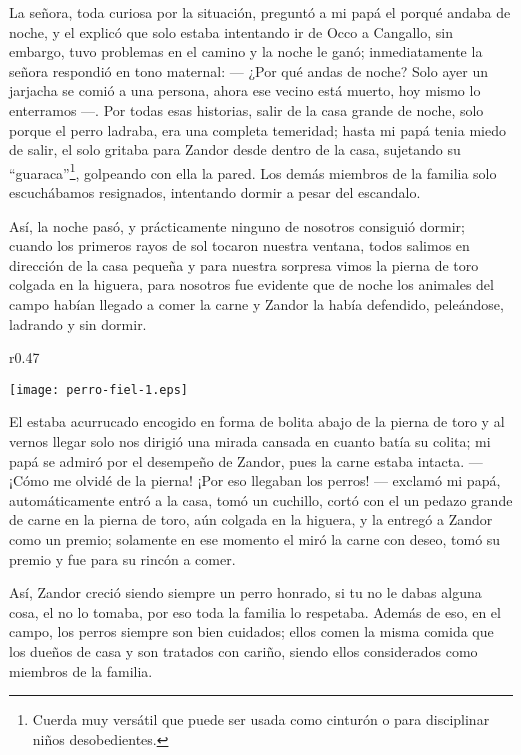 La señora, toda curiosa por la situación, preguntó a mi papá el porqué andaba de noche, y el explicó que solo estaba intentando ir de Occo a Cangallo, sin embargo, tuvo problemas en el camino y la noche le ganó; inmediatamente la señora respondió en tono maternal: 
--- ¿Por qué andas de noche? Solo ayer un jarjacha se comió a una persona, ahora ese vecino está muerto, hoy mismo lo enterramos ---.
Por todas esas historias, salir de la casa grande de noche, solo porque el perro ladraba, era una completa temeridad; hasta mi papá tenia miedo de salir, el solo gritaba para Zandor desde dentro de la casa, sujetando su ``guaraca''\footnote{Cuerda muy versátil que puede ser usada como cinturón o para disciplinar niños desobedientes.}, golpeando con ella la pared.
Los demás miembros de la familia solo escuchábamos resignados, intentando dormir a pesar del escandalo.

Así, la noche pasó, y prácticamente ninguno de nosotros consiguió dormir; cuando los primeros rayos de sol tocaron nuestra ventana, todos salimos en dirección de la casa pequeña y para nuestra sorpresa vimos la pierna de toro colgada en la higuera, para nosotros fue evidente que de noche los animales del campo habían llegado a comer la carne y Zandor la había defendido, peleándose, ladrando y sin dormir. 
\begin{wrapfigure}{r}{0.47\textwidth}
  \begin{center}
  \vspace{-0.5cm}
    \texttt{[image: perro-fiel-1.eps]}
  \end{center}
  \vspace{-0.5cm}
\end{wrapfigure}
El estaba acurrucado encogido en forma de bolita abajo de la pierna de toro y al vernos llegar solo nos dirigió una mirada cansada en cuanto batía su colita; mi papá se admiró por el desempeño de Zandor, pues la carne estaba intacta. 
--- ¡Cómo me olvidé de la pierna! ¡Por eso llegaban los perros! --- exclamó mi papá, 
automáticamente entró a la casa, tomó un cuchillo, cortó con el un pedazo grande de carne en la pierna de toro, aún colgada en la higuera, y la entregó a Zandor como un premio; solamente en ese momento el miró la carne con deseo, tomó su premio y fue para su rincón a comer.

Así, Zandor creció siendo siempre un perro honrado, si tu no le dabas alguna cosa, el no lo tomaba, por eso toda la familia lo respetaba. Además de eso, en el campo, los perros siempre son bien cuidados; ellos comen la misma comida que los dueños de casa y son tratados con cariño, siendo ellos considerados como miembros de la familia.


